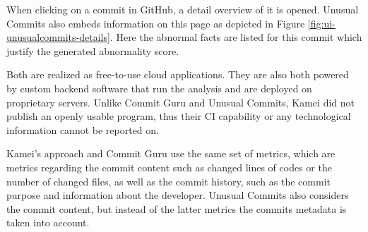 When clicking on a commit in GitHub, a detail overview of it is opened. Unusual Commits also embeds information on this page as depicted in Figure \ref{fig:ui-unusualcommits-details}. Here the abnormal facts are listed for this commit which justify the generated abnormality score.

Both are realized as free-to-use cloud applications. They are also both powered by custom backend software that run the analysis and are deployed on proprietary servers. %
Unlike Commit Guru and Unusual Commits, Kamei did not publish an openly usable program, thus their CI capability or any technological information cannot be reported on.

Kamei's approach and Commit Guru use the same set of metrics, which are metrics regarding the commit content such as changed lines of codes or the number of changed files, as well as the commit history, such as the commit purpose and information about the developer. Unusual Commits also considers the commit content, but instead of the latter metrics the commits metadata is taken into account.


